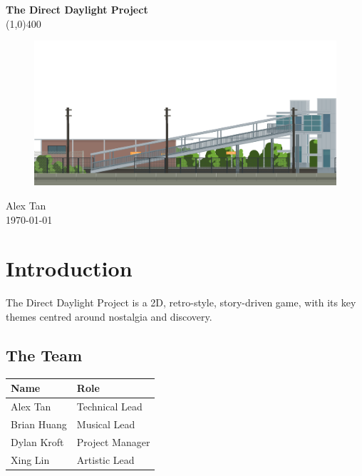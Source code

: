 \documentclass[11pt]{article}
\begin{document}
	
\begin{titlepage}
\begin{center}
\huge{\textbf{The Direct Daylight Project}}\\
\line(1,0){400}\\
\vfill{}
\begin{figure}[H]
\centering
\includegraphics[scale=1.0, width=\textwidth]{latex-images/direct-daylight.png}
\end{figure}
\vfill{}
\vfill{}
\Large{Alex Tan}\\
\Large{\today}\\
\end{center}
\thispagestyle{empty}
\end{titlepage}	

\tableofcontents
\thispagestyle{empty}
\clearpage

\setcounter{page}{1}

\section{Introduction}
The Direct Daylight Project is a 2D, retro-style, story-driven game, with its key themes centred around nostalgia and discovery.
\subsection{The Team}
\begin{center}
\begin{tabular}{ll}
\textbf{Name} & \textbf{Role} \\ 
\hline 
Alex Tan & Technical Lead \\
Brian Huang & Musical Lead \\
Dylan Kroft & Project Manager \\
Xing Lin & Artistic Lead
\end{tabular} 
\end{center}
\end{document}
